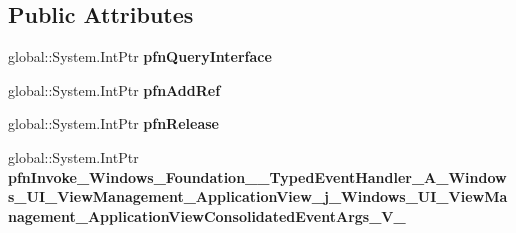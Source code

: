 \subsection*{Public Attributes}
\begin{DoxyCompactItemize}
\item 
\mbox{\label{struct_windows_1_1_foundation_1_1_typed_event_handler___a___windows___u_i___view_management___ap72530f67d076325c92c48b027e090fa9_a9ab8efff78f1434b6e8611eebdb70840}} 
global\+::\+System.\+Int\+Ptr {\bfseries pfn\+Query\+Interface}
\item 
\mbox{\label{struct_windows_1_1_foundation_1_1_typed_event_handler___a___windows___u_i___view_management___ap72530f67d076325c92c48b027e090fa9_a1a514e9128f2701877ec4de02c6b0e8a}} 
global\+::\+System.\+Int\+Ptr {\bfseries pfn\+Add\+Ref}
\item 
\mbox{\label{struct_windows_1_1_foundation_1_1_typed_event_handler___a___windows___u_i___view_management___ap72530f67d076325c92c48b027e090fa9_a60db1e49970d28547561cb77c8ee4858}} 
global\+::\+System.\+Int\+Ptr {\bfseries pfn\+Release}
\item 
\mbox{\label{struct_windows_1_1_foundation_1_1_typed_event_handler___a___windows___u_i___view_management___ap72530f67d076325c92c48b027e090fa9_af28abda17ae9c922dc40f231d5f7fb44}} 
global\+::\+System.\+Int\+Ptr {\bfseries pfn\+Invoke\+\_\+\+Windows\+\_\+\+Foundation\+\_\+\+\_\+\+Typed\+Event\+Handler\+\_\+\+A\+\_\+\+Windows\+\_\+\+U\+I\+\_\+\+View\+Management\+\_\+\+Application\+View\+\_\+j\+\_\+\+Windows\+\_\+\+U\+I\+\_\+\+View\+Management\+\_\+\+Application\+View\+Consolidated\+Event\+Args\+\_\+\+V\+\_\+}
\end{DoxyCompactItemize}
